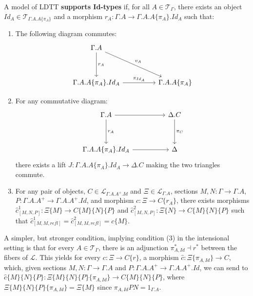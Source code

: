 \begin{defn}[Id-types]
  A model of LDTT \textbf{supports Id-types} if, for all $A \in \mathcal{T}_{\Gamma}$, there exists an object $Id_A \in \mathcal{T}_{\Gamma.A.A\{\pi_A\}}$ and a morphism $r_A : \Gamma.A \to \Gamma.A.A\{\pi_A\}.Id_{A}$ such that:
  \begin{enumerate}
    \item The following diagram commutes:
  \[
    \ti
    \Gamma.A \ar[d, "r_A"] \ar[rd, "v_A"]\\
    \Gamma.A.A\{\pi_A\}.Id_A \ar[r, "\pi_{Id_A}"] & \Gamma.A.A\{\pi_A\}
    \kz
  \]
\item For any commutative diagram:
  \[
    \ti
    \Gamma.A \ar[d, "r_A"] \ar[r] & \Delta.C \ar[d, "\pi_C"]\\
    \Gamma.A.A\{\pi_A\}.Id_A \ar[r] & \Delta
    \kz
  \]
  there exists a lift $J: \Gamma.A.A\{\pi_A\}.Id_A \to \Delta.C$ making the two triangles commute.
\item For any pair of objects, $C \in \mathcal{L}_{\Gamma.A.A^+.Id}$ and $\Xi \in \mathcal{L}_{\Gamma.A}$, sections $M, N : \Gamma \to \Gamma.A$, $P : \Gamma.A.A^+ \to \Gamma.A.A^+.Id$, and morphism $c : \Xi \to C\{r_A\}$, there exists morphisms $\hat c_{[M,N,P]}^1 : \Xi\{M\} \to C\{M\}\{N\}\{P\}$ and $\hat c_{[M, N, P]}^2 : \Xi\{N\} \to C\{M\}\{N\}\{P\}$ such that $\hat c_{[M,M,refl]}^1 = \hat c_{[M,M,refl]}^2 = c\{M\}$.
\end{enumerate}
\end{defn}
A simpler, but stronger condition, implying condition (3) in the intensional setting is that for every $A \in \mathcal{T}_\Gamma$, there is an adjunction $\pi_{A,Id}^* \dashv r^*$ between the fibers of $\mathcal{L}$. This yields for every $c : \Xi \to C\{r\}$, a morphism $\hat c : \Xi\{\pi_{A,Id}\} \to C$, which, given sections $M, N : \Gamma \to \Gamma.A$ and $P : \Gamma.A.A^+ \to \Gamma.A.A^+.Id$, we can send to $\hat c\{M\}\{N\}\{P\} : \Xi\{M\}\{N\}\{P\}\{\pi_{A,Id}\} \to C\{M\}\{N\}\{P\}$, where $\Xi\{M\}\{N\}\{P\}\{\pi_{A,Id}\} = \Xi\{M\}$ since $\pi_{A,Id}PN = 1_{\Gamma.A}$.

